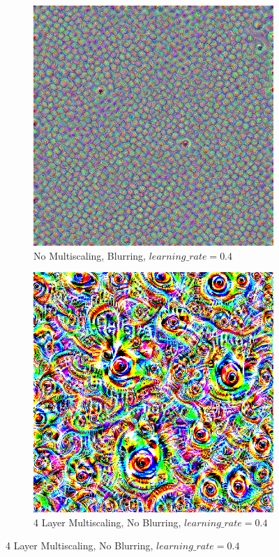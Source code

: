 \newpage
\begin{figure}
    \captionsetup{justification=centering}
    
    \begin{subfigure}[t]{0.31\textwidth}
        \captionsetup{justification=centering}
        \centering
        \includegraphics[width=.7\linewidth]{figuras/feat_vis/experiments/intermediary/l9/random_image_pl1_lr4e-1_layer19.png}
        \caption{No Multiscaling, Blurring, \(learning\_rate = 0.4\)}
    \end{subfigure}
    \hfill
    \begin{subfigure}[t]{0.31\textwidth}
        \captionsetup{justification=centering}
        \centering
        \includegraphics[width=.7\linewidth]{figuras/feat_vis/experiments/intermediary/l9/random_image_pl4_lr4e-1_layer19_no-blur.png}
        \caption{4 Layer Multiscaling, No Blurring, \(learning\_rate = 0.4\)}

\end{subfigure}
\end{figure}
